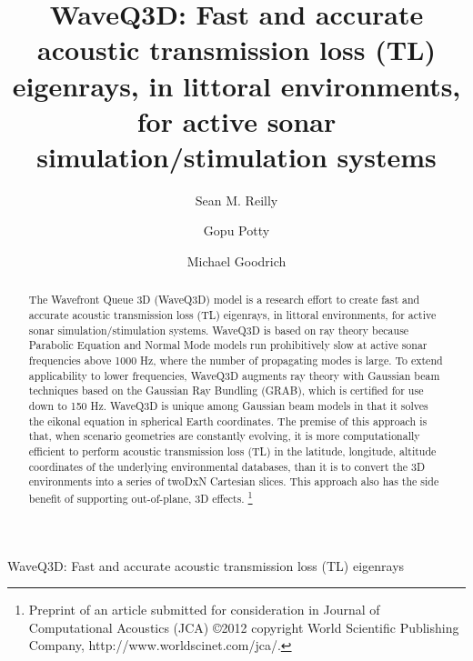 \documentclass{ws-jca}
\newcommand{\threeD}{3\nobreakdash\textendash D }	%
\begin{document}
{WaveQ3D: Fast and accurate acoustic transmission loss (TL) eigenrays}

%
\catchline{}{}{}{}{}
%

\title{WaveQ3D: Fast and accurate acoustic transmission loss (TL) eigenrays, in littoral environments, for active sonar simulation/stimulation systems}

\author{Sean M. Reilly}
\address{Department of Ocean Engineering, University of Rhode Island,\\
Narragansett RI, USA\\
 }

\author{Gopu Potty}
\address{Department of Ocean Engineering, University of Rhode Island,\\
Narragansett RI, USA\\
 }

\author{Michael Goodrich}
\address{Alion Science and Tecnology Corporation,\\
Norfolk VA, USA\\
 }

\maketitle

\begin{history}
\end{history}

\begin{abstract}
The Wavefront Queue \threeD (WaveQ3D) model is a research effort to create fast and accurate acoustic transmission loss (TL) eigenrays, in littoral environments, for active sonar simulation/stimulation systems.  WaveQ3D is based on ray theory because Parabolic Equation and Normal Mode models run prohibitively slow at active sonar frequencies above 1000 Hz, where the number of propagating modes is large.  To extend applicability to lower frequencies, WaveQ3D augments ray theory with Gaussian beam techniques based on the Gaussian Ray Bundling (GRAB), which is certified for use down to 150 Hz. WaveQ3D is unique among Gaussian beam models in that it solves the eikonal equation in spherical Earth coordinates. The premise of this approach is that, when scenario geometries are constantly evolving, it is more computationally efficient to perform acoustic transmission loss (TL) in the latitude, longitude, altitude coordinates of the underlying environmental databases, than it is to convert the \threeD environments into a series of twoDxN Cartesian slices.  This approach also has the side benefit of supporting out-of-plane, \threeD effects. \footnote{Preprint of an article submitted for consideration in Journal of Computational Acoustics (JCA) \copyright 2012 copyright World Scientific Publishing Company, http://www.worldscinet.com/jca/.}
\end{abstract}
\end{document}
